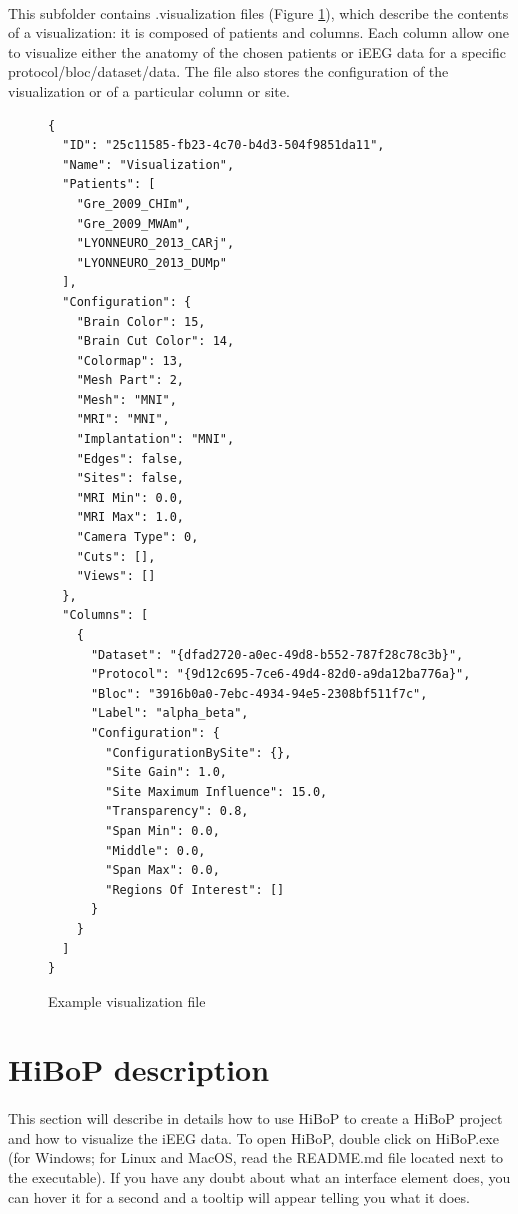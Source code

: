 \documentclass[a4paper]{article}
\begin{document}
\paragraph{} This subfolder contains .visualization files (Figure \ref{visualizationFile}), which describe the contents of a visualization: it is composed of patients and columns. Each column allow one to visualize either the anatomy of the chosen patients or iEEG data for a specific protocol/bloc/dataset/data. The file also stores the configuration of the visualization or of a particular column or site.
\begin{figure}[H]
\begin{lstlisting}
{
  "ID": "25c11585-fb23-4c70-b4d3-504f9851da11",
  "Name": "Visualization",
  "Patients": [
    "Gre_2009_CHIm",
    "Gre_2009_MWAm",
    "LYONNEURO_2013_CARj",
    "LYONNEURO_2013_DUMp"
  ],
  "Configuration": {
    "Brain Color": 15,
    "Brain Cut Color": 14,
    "Colormap": 13,
    "Mesh Part": 2,
    "Mesh": "MNI",
    "MRI": "MNI",
    "Implantation": "MNI",
    "Edges": false,
    "Sites": false,
    "MRI Min": 0.0,
    "MRI Max": 1.0,
    "Camera Type": 0,
    "Cuts": [],
    "Views": []
  },
  "Columns": [
    {
      "Dataset": "{dfad2720-a0ec-49d8-b552-787f28c78c3b}",
      "Protocol": "{9d12c695-7ce6-49d4-82d0-a9da12ba776a}",
      "Bloc": "3916b0a0-7ebc-4934-94e5-2308bf511f7c",
      "Label": "alpha_beta",
      "Configuration": {
        "ConfigurationBySite": {},
        "Site Gain": 1.0,
        "Site Maximum Influence": 15.0,
        "Transparency": 0.8,
        "Span Min": 0.0,
        "Middle": 0.0,
        "Span Max": 0.0,
        "Regions Of Interest": []
      }
    }
  ]
}
\end{lstlisting}
\caption{\label{visualizationFile}Example visualization file}
\end{figure}
\section{HiBoP description}\label{UI}
\paragraph{} This section will describe in details how to use HiBoP to create a HiBoP project and how to visualize the iEEG data. To open HiBoP, double click on HiBoP.exe (for Windows; for Linux and MacOS, read the README.md file located next to the executable). If you have any doubt about what an interface element does, you can hover it for a second and a tooltip will appear telling you what it does.
\end{document}
